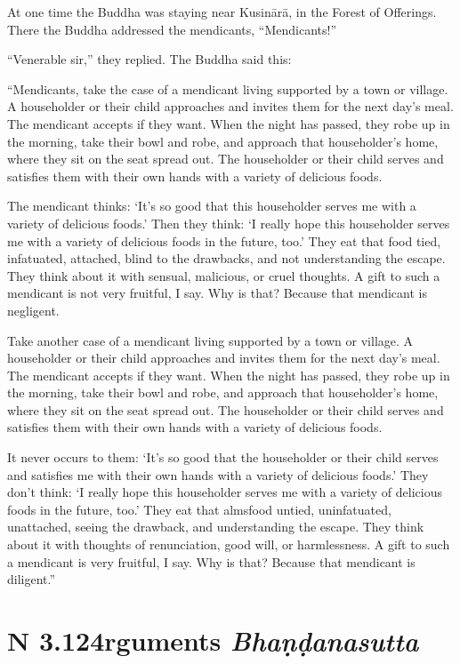 \documentclass[12pt,openany]{book}%
\newcommand*{\suttatitleacronym}[1]{\smaller[2]{#1}\vspace*{.3em}}
\newcommand*{\suttatitletranslation}[1]{\linebreak{#1}}
\newcommand*{\suttatitleroot}[1]{\linebreak\smaller[2]\itshape{#1}}
\newcommand*{\tocacronym}[1]{\hspace*{-3.3em}{#1}\quad}
\newcommand*{\toctranslation}[1]{#1}
\newcommand*{\tocroot}[1]{(\textit{#1})}
\begin{document}
At one time the Buddha was staying near \textsanskrit{Kusinārā}, in the Forest of Offerings. There the Buddha addressed the mendicants, “Mendicants!” 

“Venerable sir,” they replied. The Buddha said this: 

“Mendicants, take the case of a mendicant living supported by a town or village. A householder or their child approaches and invites them for the next day’s meal. The mendicant accepts if they want. When the night has passed, they robe up in the morning, take their bowl and robe, and approach that householder’s home, where they sit on the seat spread out. The householder or their child serves and satisfies them with their own hands with a variety of delicious foods. 

The mendicant thinks: ‘It’s so good that this householder serves me with a variety of delicious foods.’ Then they think: ‘I really hope this householder serves me with a variety of delicious foods in the future, too.’ They eat that food tied, infatuated, attached, blind to the drawbacks, and not understanding the escape. They think about it with sensual, malicious, or cruel thoughts. A gift to such a mendicant is not very fruitful, I say. Why is that? Because that mendicant is negligent. 

Take another case of a mendicant living supported by a town or village. A householder or their child approaches and invites them for the next day’s meal. The mendicant accepts if they want. When the night has passed, they robe up in the morning, take their bowl and robe, and approach that householder’s home, where they sit on the seat spread out. The householder or their child serves and satisfies them with their own hands with a variety of delicious foods. 

It never occurs to them: ‘It’s so good that the householder or their child serves and satisfies me with their own hands with a variety of delicious foods.’ They don’t think: ‘I really hope this householder serves me with a variety of delicious foods in the future, too.’ They eat that almsfood untied, uninfatuated, unattached, seeing the drawback, and understanding the escape. They think about it with thoughts of renunciation, good will, or harmlessness. A gift to such a mendicant is very fruitful, I say. Why is that? Because that mendicant is diligent.” 

%
\section*{{\suttatitleacronym AN 3.124}{\suttatitletranslation Arguments }{\suttatitleroot Bhaṇḍanasutta}}
\addcontentsline{toc}{section}{\tocacronym{AN 3.124} \toctranslation{Arguments } \tocroot{Bhaṇḍanasutta}}
\end{document}
